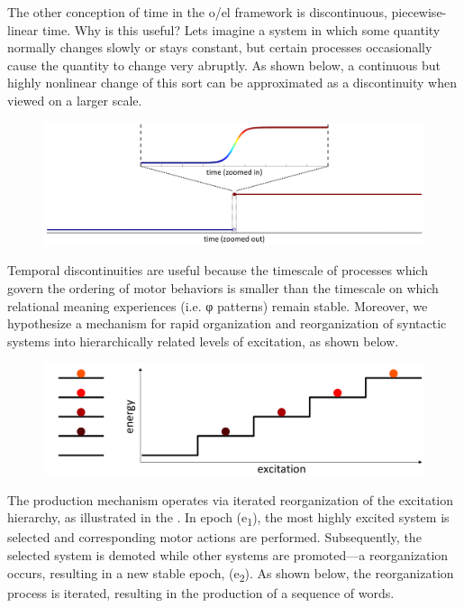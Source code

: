   The other conception of time in the o/el framework is discontinuous, piecewise-linear time. Why is this useful? Lets imagine a system in which some quantity normally changes slowly or stays constant, but certain processes occasionally cause the quantity to change very abruptly. As shown below, a continuous but highly nonlinear change of this sort can be approximated as a discontinuity when viewed on a larger scale.

  
\begin{figure}
\includegraphics[width=\textwidth]{figures/Tilsen-img4.png}
\caption{\missingcaption}
\label{fig:1:4}
\end{figure}
 

  Temporal discontinuities are useful because the timescale of processes which govern the ordering of motor behaviors is smaller than the timescale on which relational meaning experiences (i.e. φ patterns) remain stable. Moreover, we hypothesize a mechanism for rapid organization and reorganization of syntactic systems into hierarchically related levels of excitation, as shown below.

  
\begin{figure}
\includegraphics[width=\textwidth]{figures/Tilsen-img5.png}
\caption{\missingcaption}
\label{fig:1:5}
\end{figure}
 

  The production mechanism operates via iterated reorganization of the excitation hierarchy, as illustrated in the {\figurebelow}. In epoch (e\textsubscript{1}), the most highly excited system is selected and corresponding motor actions are performed. Subsequently, the selected system is demoted while other systems are promoted—a reorganization occurs, resulting in a new stable epoch, (e\textsubscript{2}). As shown below, the reorganization process is iterated, resulting in the production of a sequence of words.

